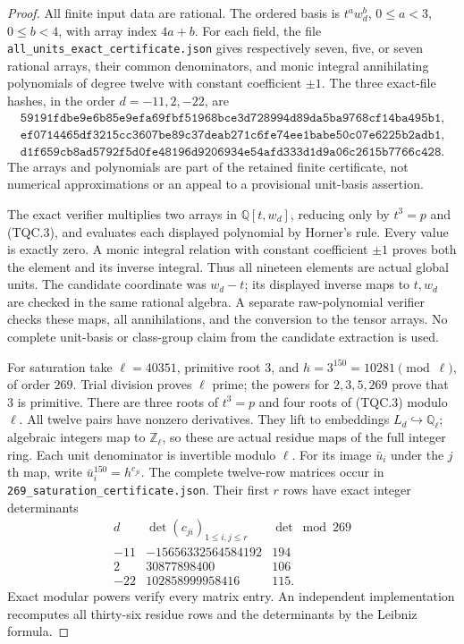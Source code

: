 \begin{proof}
All finite input data are rational.  The ordered basis is
$t^a w_d^b$, $0\le a<3$, $0\le b<4$, with array index $4a+b$.
For each field, the file \texttt{all\_units\_exact\_certificate.json}
gives respectively seven, five, or seven rational arrays, their
common denominators, and monic integral annihilating polynomials
of degree twelve with constant coefficient $\pm1$.
The three exact-file hashes, in the order $d=-11,2,-22$, are
\begin{gather*}
\texttt{59191fdbe9e6b85e9efa69fbf51968bce3}\allowbreak
\texttt{d728994d89da5ba9768cf14ba495b1},\\
\texttt{ef0714465df3215cc3607be89c37deab27}\allowbreak
\texttt{1c6fe74ee1babe50c07e6225b2adb1},\\
\texttt{d1f659cb8ad5792f5d0fe48196d9206934}\allowbreak
\texttt{e54afd333d1d9a06c2615b7766c428}.
\end{gather*}
The arrays and polynomials are part of the retained finite
certificate, not numerical approximations or an appeal to a
provisional unit-basis assertion.

The exact verifier multiplies two arrays in $\mathbb Q[t,w_d]$,
reducing only by $t^3=p$ and (TQC.3), and evaluates each displayed
polynomial by Horner's rule.  Every value is exactly zero.
A monic integral relation with constant coefficient $\pm1$
proves both the element and its inverse integral.
Thus all nineteen elements are actual global units.
The candidate coordinate was $w_d-t$; its displayed inverse maps
to $t,w_d$ are checked in the same rational algebra.
A separate raw-polynomial verifier checks these maps, all
annihilations, and the conversion to the tensor arrays.
No complete unit-basis or class-group claim from the candidate
extraction is used.

For saturation take $\ell=40351$, primitive root $3$, and
$h=3^{150}=10281\pmod\ell$, of order $269$.
Trial division proves $\ell$ prime; the powers for $2,3,5,269$
prove that $3$ is primitive.
There are three roots of $t^3=p$ and four roots of (TQC.3)
modulo $\ell$.  All twelve pairs have nonzero derivatives.
They lift to embeddings $L_d\hookrightarrow\mathbb Q_\ell$;
algebraic integers map to $\mathbb Z_\ell$, so these are actual
residue maps of the full integer ring.
Each unit denominator is invertible modulo $\ell$.
For its image $\bar u_i$ under the $j$th map, write
$\bar u_i^{150}=h^{c_{ji}}$.
The complete twelve-row matrices occur in
\texttt{269\_saturation\_certificate.json}.
Their first $r$ rows have exact integer determinants
\[
\begin{array}{c|r|r}
d&\det(c_{ji})_{1\le i,j\le r}&\det\bmod269\\\hline
-11&-15656332564584192&194\\
2&30877898400&106\\
-22&102858999958416&115.
\end{array}
\tag{TQC.6}
\]
Exact modular powers verify every matrix entry.
An independent implementation recomputes all thirty-six residue
rows and the determinants by the Leibniz formula.


\end{proof}
